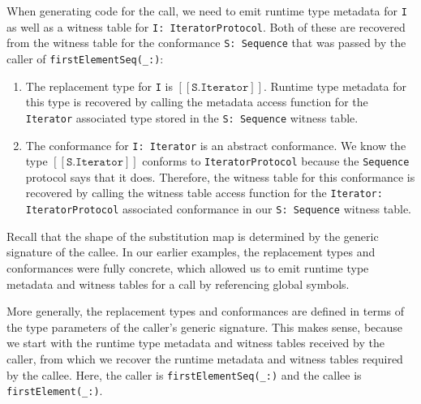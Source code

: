 \documentclass[a4paper,headsepline,bibliography=totoc,toc=flat,fleqn,twoside=semi]{scrbook}
\theoremstyle{definition}
\theoremstyle{definition}
\theoremstyle{definition}
\newcommand{\archetype}[1]{$[\![\texttt{#1}]\!]$}
\begin{document}
When generating code for the call, we need to emit runtime type metadata for \texttt{I} as well as a witness table for \verb|I: IteratorProtocol|. Both of these are recovered from the witness table for the conformance \verb|S: Sequence| that was passed by the caller of \verb|firstElementSeq(_:)|:
\begin{enumerate}
\item The replacement type for \texttt{I} is \archetype{S.Iterator}. Runtime type metadata for this type is recovered by calling the metadata access function for the \texttt{Iterator} associated type stored in the \verb|S: Sequence| witness table.
\item The conformance for \verb|I: Iterator| is an abstract conformance. We know the type \archetype{S.Iterator} conforms to \verb|IteratorProtocol| because the \texttt{Sequence} protocol says that it does. Therefore, the witness table for this conformance is recovered by calling the witness table access function for the \verb|Iterator: IteratorProtocol| associated conformance in our \verb|S: Sequence| witness table.
\end{enumerate}

Recall that the shape of the substitution map is determined by the generic signature of the callee. In our earlier examples, the replacement types and conformances were fully concrete, which allowed us to emit runtime type metadata and witness tables for a call by referencing global symbols.

More generally, the replacement types and conformances are defined in terms of the type parameters of the caller's generic signature. This makes sense, because we start with the runtime type metadata and witness tables received by the caller, from which we recover the runtime metadata and witness tables required by the callee. Here, the caller is \verb|firstElementSeq(_:)| and the callee is \verb|firstElement(_:)|.
\end{document}
